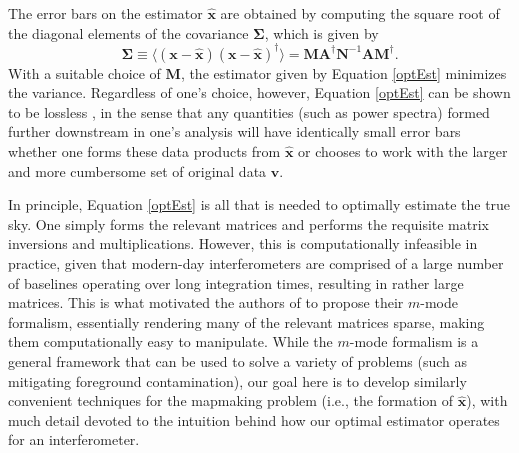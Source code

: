 \documentclass[twocolumn,apj,numberedappendix]{emulateapj}
\newcommand{\vis}{\mathbf{v}}
\newcommand{\x}{\mathbf{x}}
\newcommand{\xhat}{\hat{\mathbf{x}}}
\newcommand{\A}{\mathbf{A}}
\newcommand{\N}{\mathbf{N}}
\begin{document}
The error bars on the estimator $\xhat$ are obtained by computing the square root
of the diagonal elements of the covariance $\boldsymbol \Sigma$, which is given by
\begin{equation}
\label{eq:sigma}
\boldsymbol \Sigma \equiv \langle (\x - \xhat) ( \x - \xhat)^\dagger \rangle = \mathbf{M} \A^\dagger \N^{-1} \A\mathbf{M}^\dagger.
\end{equation}
With a suitable choice of $\mathbf{M}$, the estimator given by Equation \eqref{optEst}
minimizes the variance. Regardless of one's choice, however, Equation \eqref{optEst} 
can be shown to be lossless \citep{Tegmark97}, in the sense that any quantities (such as power
spectra) formed further downstream in one's analysis will have identically
small error bars whether one forms these data products from $\xhat$ or chooses
to work with the larger and more cumbersome set of original data $\vis$.
%
%
%

In principle, Equation \eqref{optEst} is all that is needed to optimally
estimate the true sky.  One simply forms the relevant matrices and performs the
requisite matrix inversions and multiplications.  However, this is
computationally infeasible in practice, given that modern-day interferometers
are comprised of a large number of baselines operating over long integration
times, resulting in rather large matrices.  This is what motivated the authors
of \cite{Shaw2013} to propose their $m$-mode formalism, essentially rendering
many of the relevant matrices sparse, making them computationally easy to
manipulate.  While the $m$-mode formalism is a general framework that can be
used to solve a variety of problems (such as mitigating foreground
contamination), our goal here is to develop similarly convenient techniques for
the mapmaking problem (i.e., the formation of $\xhat$), with much detail
devoted to the intuition behind how our optimal estimator operates for an
interferometer.
\end{document}
